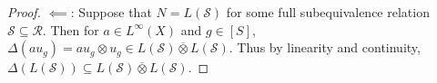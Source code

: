 \documentclass[12pt,letterpaper]{article}
\newcommand{\sub}{\subseteq}
\newcommand*\cls[1]{\overline{#1}}
\theoremstyle{definition}
\theoremstyle{plain}
\theoremstyle{remark}
\begin{document}
\begin{proof}
    \underline{$ \impliedby $}: Suppose that $ N = L(\mathcal{S}) $ for some full subequivalence relation $ \mathcal{S}\sub \mathcal{R} $. Then for $ a\in L^{\infty}(X) $ and $ g\in [S] $, $ \Delta (au_{g}) = au_{g} \otimes u_{g}\in L(\mathcal{S}) \cls{\otimes }L(\mathcal{S}) $. Thus by linearity and continuity, $ \Delta (L(\mathcal{S}))\sub L(\mathcal{S}) \cls{\otimes }L(\mathcal{S}) $.
    
\end{proof}




\printbibliography
\end{document}
